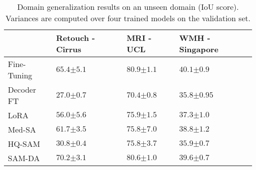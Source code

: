 \begin{table*}[]
\caption{Domain generalization results on an unseen domain (IoU score). Variances are computed over four trained models on the validation set.\label{tab:zero_shot}}
\centering
\begin{tabular}{@{}lP{2.8cm}P{2.5cm}P{3.2cm}@{}}
\toprule
 & Retouch - Cirrus & MRI - UCL & WMH - Singapore \\ \midrule
Fine-Tuning & $65.4{\scriptscriptstyle \pm 5.1}$ & $80.9{\scriptscriptstyle \pm 1.1}$ & $40.1{\scriptscriptstyle \pm 0.9}$ \\ \midrule
Decoder FT & $27.0{\scriptscriptstyle \pm 0.7}$ & $70.4{\scriptscriptstyle \pm 0.8}$ & $35.8{\scriptscriptstyle \pm 0.95}$ \\
LoRA~\cite{hu2022lora} & $56.0{\scriptscriptstyle \pm 5.6}$ & $75.9{\scriptscriptstyle \pm 1.5}$ & $37.3{\scriptscriptstyle \pm 1.0}$ \\
Med-SA~\cite{wu2023medical} & $61.7{\scriptscriptstyle \pm 3.5}$ & $75.8{\scriptscriptstyle \pm 7.0}$ & $38.8{\scriptscriptstyle \pm 1.2}$ \\
HQ-SAM~\cite{ke2024segment} & $30.8{\scriptscriptstyle \pm 0.4}$ & $75.8{\scriptscriptstyle \pm 3.7}$ & $35.9{\scriptscriptstyle \pm 0.7}$ \\ \midrule
SAM-DA & $\mathbf{70.2}{\scriptscriptstyle \pm 3.1}$ & $\mathbf{80.6}{\scriptscriptstyle \pm 1.0}$ & $\mathbf{39.6}{\scriptscriptstyle \pm 0.7}$ \\ \bottomrule
\end{tabular}
\end{table*}




